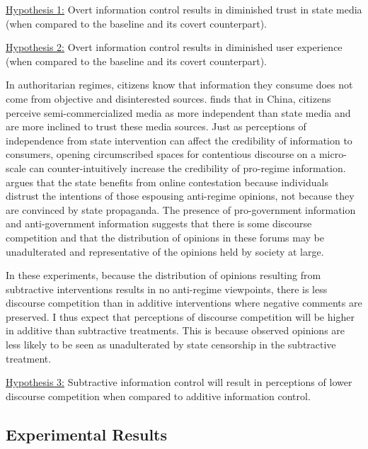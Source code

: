\documentclass[11pt]{article}
\begin{document}
\noindent\underline{Hypothesis 1:} Overt information control results in diminished trust in state media (when compared to the baseline and its covert counterpart).\newline

\noindent\underline{Hypothesis 2:} Overt information control results in diminished user experience (when compared to the baseline and its covert counterpart).\newline

In authoritarian regimes, citizens know that information they consume does not come from objective and disinterested sources. \cite{stockmann2013media} finds that in China, citizens perceive semi-commercialized media as more independent than state media and are more inclined to trust these media sources. Just as perceptions of independence from state intervention can affect the credibility of information to consumers, opening circumscribed spaces for contentious discourse on a micro-scale can counter-intuitively increase the credibility of pro-regime information. \cite{han2018contesting} argues that the state benefits from online contestation because individuals distrust the intentions of those espousing anti-regime opinions, not because they are convinced by state propaganda. The presence of pro-government information and anti-government information suggests that there is some discourse competition and that the distribution of opinions in these forums may be unadulterated and representative of the opinions held by society at large.

In these experiments, because the distribution of opinions resulting from subtractive interventions results in no anti-regime viewpoints, there is less discourse competition than in additive interventions where negative comments are preserved. I thus expect that perceptions of discourse competition will be higher in additive than subtractive treatments. This is because observed opinions are less likely to be seen as unadulterated by state censorship in the subtractive treatment.

\noindent\underline{Hypothesis 3:} Subtractive information control will result in perceptions of lower discourse competition when compared to additive information control.\newline

\subsection{Experimental Results}
\end{document}
